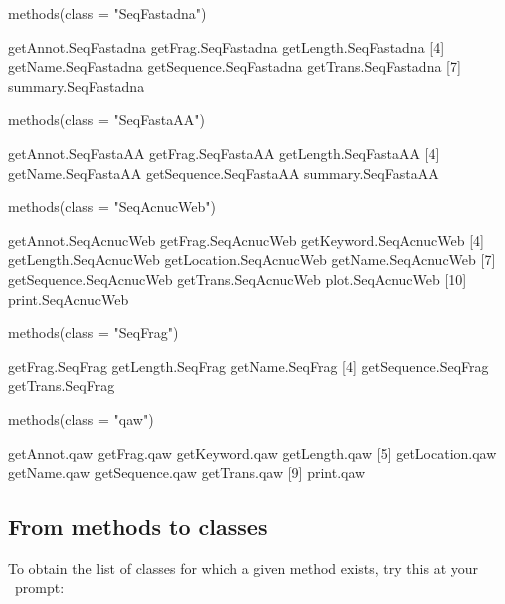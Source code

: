 \documentclass{article}
\begin{document}
\begin{Schunk}
\begin{Sinput}
 methods(class = "SeqFastadna")
\end{Sinput}
\begin{Soutput}
[1] getAnnot.SeqFastadna    getFrag.SeqFastadna     getLength.SeqFastadna  
[4] getName.SeqFastadna     getSequence.SeqFastadna getTrans.SeqFastadna   
[7] summary.SeqFastadna    
\end{Soutput}
\begin{Sinput}
 methods(class = "SeqFastaAA")
\end{Sinput}
\begin{Soutput}
[1] getAnnot.SeqFastaAA    getFrag.SeqFastaAA     getLength.SeqFastaAA  
[4] getName.SeqFastaAA     getSequence.SeqFastaAA summary.SeqFastaAA    
\end{Soutput}
\begin{Sinput}
 methods(class = "SeqAcnucWeb")
\end{Sinput}
\begin{Soutput}
 [1] getAnnot.SeqAcnucWeb    getFrag.SeqAcnucWeb     getKeyword.SeqAcnucWeb 
 [4] getLength.SeqAcnucWeb   getLocation.SeqAcnucWeb getName.SeqAcnucWeb    
 [7] getSequence.SeqAcnucWeb getTrans.SeqAcnucWeb    plot.SeqAcnucWeb       
[10] print.SeqAcnucWeb      
\end{Soutput}
\begin{Sinput}
 methods(class = "SeqFrag")
\end{Sinput}
\begin{Soutput}
[1] getFrag.SeqFrag     getLength.SeqFrag   getName.SeqFrag    
[4] getSequence.SeqFrag getTrans.SeqFrag   
\end{Soutput}
\begin{Sinput}
 methods(class = "qaw")
\end{Sinput}
\begin{Soutput}
[1] getAnnot.qaw    getFrag.qaw     getKeyword.qaw  getLength.qaw  
[5] getLocation.qaw getName.qaw     getSequence.qaw getTrans.qaw   
[9] print.qaw      
\end{Soutput}
\end{Schunk}

\subsection{From methods to classes}

To obtain the list of classes for which a given method exists, try this at your \Rlogo{}~prompt:
\end{document}
